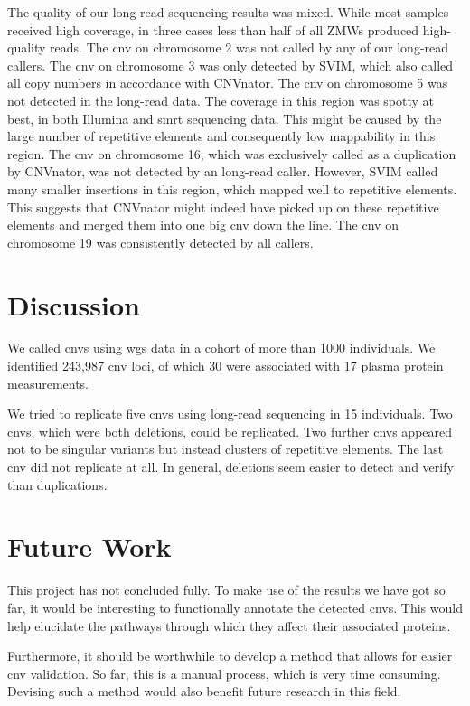 \documentclass[draft]{scrbook}
\begin{document}
The quality of our long-read sequencing results was mixed.
While most samples received high coverage, in three cases less than half of all ZMWs produced high-quality reads.
The \gls{cnv} on chromosome 2 was not called by any of our long-read callers.
The \gls{cnv} on chromosome 3 was only detected by \textsf{SVIM}, which also called all copy numbers in accordance with \textsf{CNVnator}.
The \gls{cnv} on chromosome 5 was not detected in the long-read data.
The coverage in this region was spotty at best, in both Illumina and \gls{smrt} sequencing data.
This might be caused by the large number of repetitive elements and consequently low mappability in this region.
The \gls{cnv} on chromosome 16, which was exclusively called as a duplication by \textsf{CNVnator}, was not detected by an long-read caller.
However, \textsf{SVIM} called many smaller insertions in this region, which mapped well to repetitive elements.
This suggests that \textsf{CNVnator} might indeed have picked up on these repetitive elements and merged them into one big \gls{cnv} down the line.
The \gls{cnv} on chromosome 19 was consistently detected by all callers.

\section{Discussion}
We called \glspl{cnv} using \gls{wgs} data in a cohort of more than 1000 individuals.
We identified 243,987 \gls{cnv} loci, of which 30 were associated with 17 plasma protein measurements.

We tried to replicate five \glspl{cnv} using long-read sequencing in 15 individuals.
Two \glspl{cnv}, which were both deletions, could be replicated.
Two further \glspl{cnv} appeared not to be singular variants but instead clusters of repetitive elements.
The last \gls{cnv} did not replicate at all.
In general, deletions seem easier to detect and verify than duplications.

\section{Future Work}
This project has not concluded fully.
To make use of the results we have got so far, it would be interesting to functionally annotate the detected \glspl{cnv}.
This would help elucidate the pathways through which they affect their associated proteins.

Furthermore, it should be worthwhile to develop a method that allows for easier \gls{cnv} validation.
So far, this is a manual process, which is very time consuming.
Devising such a method would also benefit future research in this field.
\end{document}
